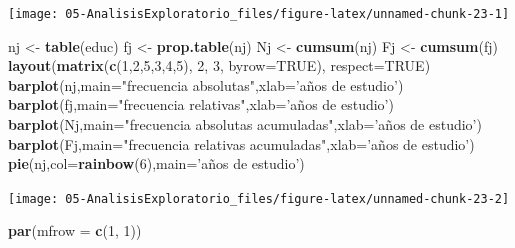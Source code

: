 \documentclass[]{book}
\newenvironment{Shaded}{\begin{snugshade}}{\end{snugshade}}
\newcommand{\KeywordTok}[1]{\textcolor[rgb]{0.13,0.29,0.53}{\textbf{#1}}}
\newcommand{\DataTypeTok}[1]{\textcolor[rgb]{0.13,0.29,0.53}{#1}}
\newcommand{\DecValTok}[1]{\textcolor[rgb]{0.00,0.00,0.81}{#1}}
\newcommand{\StringTok}[1]{\textcolor[rgb]{0.31,0.60,0.02}{#1}}
\newcommand{\OtherTok}[1]{\textcolor[rgb]{0.56,0.35,0.01}{#1}}
\newcommand{\NormalTok}[1]{#1}
\begin{document}
\begin{center}\texttt{[image: 05-AnalisisExploratorio\_files/figure-latex/unnamed-chunk-23-1]} \end{center}

\begin{Shaded}
\begin{Highlighting}[]
\NormalTok{nj <-}\StringTok{ }\KeywordTok{table}\NormalTok{(educ)}
\NormalTok{fj <-}\StringTok{ }\KeywordTok{prop.table}\NormalTok{(nj)}
\NormalTok{Nj <-}\StringTok{ }\KeywordTok{cumsum}\NormalTok{(nj)}
\NormalTok{Fj <-}\StringTok{ }\KeywordTok{cumsum}\NormalTok{(fj)}
\KeywordTok{layout}\NormalTok{(}\KeywordTok{matrix}\NormalTok{(}\KeywordTok{c}\NormalTok{(}\DecValTok{1}\NormalTok{,}\DecValTok{2}\NormalTok{,}\DecValTok{5}\NormalTok{,}\DecValTok{3}\NormalTok{,}\DecValTok{4}\NormalTok{,}\DecValTok{5}\NormalTok{), }\DecValTok{2}\NormalTok{, }\DecValTok{3}\NormalTok{, }\DataTypeTok{byrow=}\OtherTok{TRUE}\NormalTok{), }\DataTypeTok{respect=}\OtherTok{TRUE}\NormalTok{)}
\KeywordTok{barplot}\NormalTok{(nj,}\DataTypeTok{main=}\StringTok{"frecuencia absolutas"}\NormalTok{,}\DataTypeTok{xlab=}\StringTok{'años de estudio'}\NormalTok{)}
\KeywordTok{barplot}\NormalTok{(fj,}\DataTypeTok{main=}\StringTok{"frecuencia relativas"}\NormalTok{,}\DataTypeTok{xlab=}\StringTok{'años de estudio'}\NormalTok{)}
\KeywordTok{barplot}\NormalTok{(Nj,}\DataTypeTok{main=}\StringTok{"frecuencia absolutas acumuladas"}\NormalTok{,}\DataTypeTok{xlab=}\StringTok{'años de estudio'}\NormalTok{)}
\KeywordTok{barplot}\NormalTok{(Fj,}\DataTypeTok{main=}\StringTok{"frecuencia relativas acumuladas"}\NormalTok{,}\DataTypeTok{xlab=}\StringTok{'años de estudio'}\NormalTok{)}
\KeywordTok{pie}\NormalTok{(nj,}\DataTypeTok{col=}\KeywordTok{rainbow}\NormalTok{(}\DecValTok{6}\NormalTok{),}\DataTypeTok{main=}\StringTok{'años de estudio'}\NormalTok{)}
\end{Highlighting}
\end{Shaded}

\begin{center}\texttt{[image: 05-AnalisisExploratorio\_files/figure-latex/unnamed-chunk-23-2]} \end{center}

\begin{Shaded}
\begin{Highlighting}[]
\KeywordTok{par}\NormalTok{(}\DataTypeTok{mfrow =} \KeywordTok{c}\NormalTok{(}\DecValTok{1}\NormalTok{, }\DecValTok{1}\NormalTok{))}
\end{Highlighting}
\end{Shaded}
\end{document}
